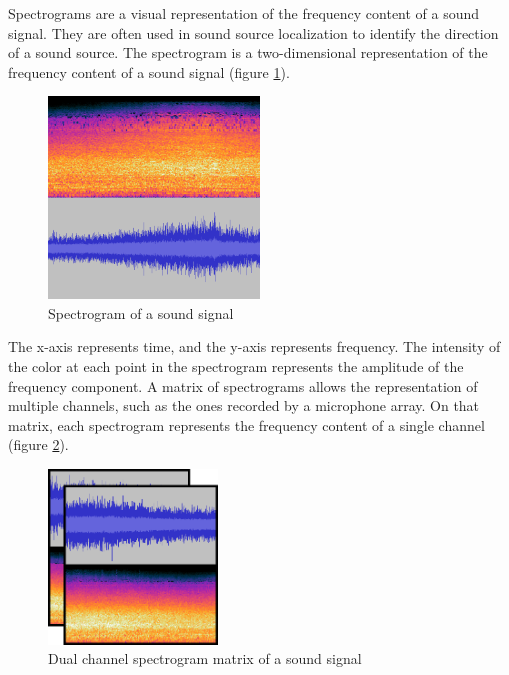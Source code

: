 Spectrograms are a visual representation of the frequency content of a sound signal. They are often used in sound source localization to identify the direction of a sound source. The spectrogram is a two-dimensional representation of the frequency content of a sound signal (figure \ref*{fig:spectrogram_example}).

\begin{figure}[H]
    \centering
    \includegraphics[width=0.5\textwidth]{../Images/spectrogram-example.png}
    \caption{Spectrogram of a sound signal}
    \label{fig:spectrogram_example}
\end{figure}

The x-axis represents time, and the y-axis represents frequency. The intensity of the color at each point in the spectrogram represents the amplitude of the frequency component. A matrix of spectrograms allows the representation of multiple channels, such as the ones recorded by a microphone array. On that matrix, each spectrogram represents the frequency content of a single channel (figure \ref*{fig:2_channel_spectrogram_example}).

\begin{figure}[H]
    \centering
    \includegraphics[width=0.4\textwidth]{../Images/2-channel-spectrogram-example.png}
    \caption{Dual channel spectrogram matrix of a sound signal}
    \label{fig:2_channel_spectrogram_example}
\end{figure}

